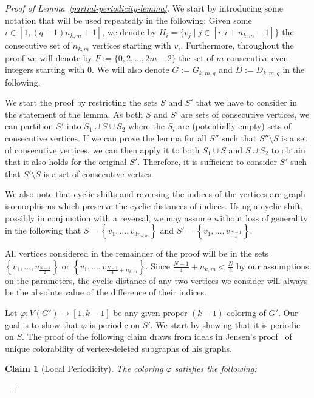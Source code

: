 \documentclass[a4paper,10pt,hidelinks]{amsart}
\newtheorem{claim}[theorem]{Claim}
\theoremstyle{definition}
\begin{document}
\begin{proof}[Proof of Lemma~\ref{partial-periodicity-lemma}]
We start by introducing some notation that will be used repeatedly in the following:
Given some $i \in [1, (q-1)n_{k,m} + 1]$, we denote by $H_i = \{v_j \mid j \in [i, i + n_{k,m} - 1]\}$
    the consecutive set of $n_{k,m}$ vertices starting with $v_i$. Furthermore, throughout the proof we will denote by $F:=\{0,2,\ldots,2m-2\}$ the set of $m$ consecutive even integers starting with $0$. We will also denote $G:=G_{k,m,q}$ and $D:=D_{k,m,q}$ in the following.

    We start the proof by restricting the sets $S$ and $S'$ that we have to consider in the statement of the lemma. As both $S$ and $S'$ are sets of consecutive vertices, we can partition $S'$ into $S_1 \cup S \cup S_2$ where the $S_i$ are (potentially empty) sets of consecutive vertices. If we can prove the lemma for all $S''$ such that $S'' \setminus S$ is a set of consecutive vertices, we can then apply it to both $S_1 \cup S$ and $S \cup S_2$ to obtain that it also holds for the original $S'$. Therefore, it is sufficient to consider $S'$ such that $S' \setminus S$ is a set of consecutive vertics.
    
    We also note that cyclic shifts and reversing the indices of the vertices are graph isomorphisms which preserve the cyclic distances of indices. Using a cyclic shift, possibly in conjunction with a reversal, we may assume without loss of generality in the following that $S = \left\{v_1, \dots, v_{3n_{k, m}}\right\}$ and $S' = \left\{v_1, \dots, v_{\frac{N-1}{4}}\right\}$.

    All vertices considered in the remainder of the proof will be in the sets $\left\{v_1, \dots, v_{\frac{N-1}{2}}\right\}$ or $\left\{v_1, \dots, v_{\frac{N-1}{4} + n_{k,m}}\right\}$. Since $\frac{N-1}{4}+n_{k,m}< \frac{N}{2}$ by our assumptions on the parameters, the cyclic distance of any two vertices we consider will always be the absolute value of the difference of their indices.
    
    Let $\varphi:V(G')\rightarrow [1,k-1]$ be any given proper $(k - 1)$-coloring of $G'$. Our goal is to show that $\varphi$ is periodic on $S'$. We start by showing that it is periodic on $S$. The proof of the following claim draws from ideas in Jensen's proof~\cite{jensen} of unique colorability of vertex-deleted subgraphs of his graphs.

    \begin{claim}[Local Periodicity]\label{local-periodicity-claim}
        The coloring $\varphi$ satisfies the following:


\end{claim}
\end{proof}
\end{document}
